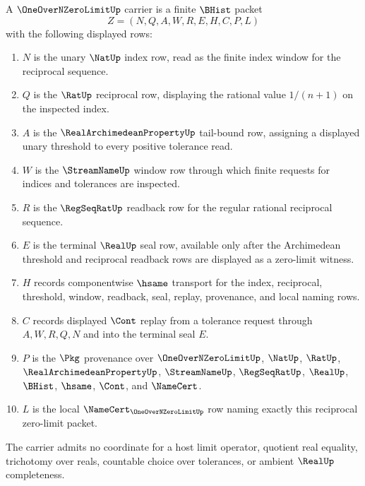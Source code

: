 \begin{definition}
\label{def:one-over-n-zero-limit-carrier}
A $\OneOverNZeroLimitUp$ carrier is a finite $\BHist$ packet
$$
Z=(N,Q,A,W,R,E,H,C,P,L)
$$
with the following displayed rows:
\begin{enumerate}
\item $N$ is the unary $\NatUp$ index row, read as the finite index window for the reciprocal sequence.
\item $Q$ is the $\RatUp$ reciprocal row, displaying the rational value $1/(n+1)$ on the inspected index.
\item $A$ is the $\RealArchimedeanPropertyUp$ tail-bound row, assigning a displayed unary threshold to every positive tolerance read.
\item $W$ is the $\StreamNameUp$ window row through which finite requests for indices and tolerances are inspected.
\item $R$ is the $\RegSeqRatUp$ readback row for the regular rational reciprocal sequence.
\item $E$ is the terminal $\RealUp$ seal row, available only after the Archimedean threshold and reciprocal readback rows are displayed as a zero-limit witness.
\item $H$ records componentwise $\hsame$ transport for the index, reciprocal, threshold, window, readback, seal, replay, provenance, and local naming rows.
\item $C$ records displayed $\Cont$ replay from a tolerance request through $A,W,R,Q,N$ and into the terminal seal $E$.
\item $P$ is the $\Pkg$ provenance over $\OneOverNZeroLimitUp$, $\NatUp$, $\RatUp$, $\RealArchimedeanPropertyUp$, $\StreamNameUp$, $\RegSeqRatUp$, $\RealUp$, $\BHist$, $\hsame$, $\Cont$, and $\NameCert$.
\item $L$ is the local $\NameCert_{\OneOverNZeroLimitUp}$ row naming exactly this reciprocal zero-limit packet.
\end{enumerate}
The carrier admits no coordinate for a host limit operator, quotient real equality, trichotomy over reals, countable choice over tolerances, or ambient $\RealUp$ completeness.
\end{definition}

